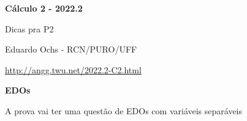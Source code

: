\documentclass[oneside,12pt]{article}
\begin{document}


\def\u#1{\par{\footnotesize \url{#1}}}

\def\drafturl{http://angg.twu.net/LATEX/2022-2-C2.pdf}
\def\drafturl{http://angg.twu.net/2022.2-C2.html}
\def\draftfooter{\tiny \href{\drafturl}{\jobname{}} \ColorBrown{\shorttoday{} \hours}}



%

\thispagestyle{empty}

\begin{center}

\vspace*{1.2cm}

{\bf \Large Cálculo 2 - 2022.2}

\bsk

Dicas pra P2

\bsk

Eduardo Ochs - RCN/PURO/UFF

\url{http://angg.twu.net/2022.2-C2.html}

\end{center}

\newpage


{\bf EDOs}

A prova vai ter uma questão de EDOs com variáveis separáveis
\end{document}

